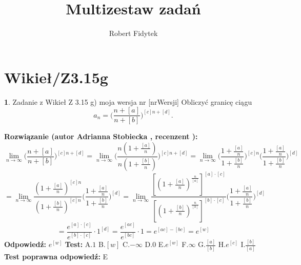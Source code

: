 \documentclass[12pt, a4paper]{article}
\title{Multizestaw zadań}
\author{Robert Fidytek}
\date{}
\theoremstyle{definition} %
\newtheorem{zad}{}
\newcommand{\kategoria}[1]{\section{#1}} %
\newcommand{\zadStart}[1]{\begin{zad}#1\newline} %
\newcommand{\zadStop}{\end{zad}}   %
\newcommand{\rozwStart}[2]{\noindent \textbf{Rozwiązanie (autor #1 , recenzent #2): }\newline} %
\newcommand{\rozwStop}{\newline}                                            %
\newcommand{\odpStart}{\noindent \textbf{Odpowiedź:}\newline}    %
\newcommand{\odpStop}{\newline}                                             %
\newcommand{\testStart}{\noindent \textbf{Test:}\newline} %
\newcommand{\testStop}{\newline} %
\newcommand{\kluczStart}{\noindent \textbf{Test poprawna odpowiedź:}\newline} %
\newcommand{\kluczStop}{\newline} %
\begin{document}
\maketitle


\kategoria{Wikieł/Z3.15g}
\zadStart{Zadanie z Wikieł Z 3.15 g) moja wersja nr [nrWersji]}
Obliczyć granicę ciągu 
$$a_n=\bigg(\frac{n+[a]}{n+[b]}\bigg)^{[c]n+[d]}.$$
\zadStop
\rozwStart{Adrianna Stobiecka}{}
$$\lim_{n\to\infty}\bigg(\frac{n+[a]}{n+[b]}\bigg)^{[c]n+[d]}=\lim_{n\to\infty}\bigg(\frac{n(1+\frac{[a]}{n})}{n(1+\frac{[b]}{n})}\bigg)^{[c]n+[d]}=\lim_{n\to\infty}\bigg(\frac{1+\frac{[a]}{n}}{1+\frac{[b]}{n}}\bigg)^{[c]n}\bigg(\frac{1+\frac{[a]}{n}}{1+\frac{[b]}{n}}\bigg)^{[d]}$$
$$=\lim_{n\to\infty}\frac{(1+\frac{[a]}{n})^{[c]n}}{(1+\frac{[b]}{n})^{[c]n}}\bigg(\frac{1+\frac{[a]}{n}}{1+\frac{[b]}{n}}\bigg)^{[d]}=\lim_{n\to\infty}\frac{[(1+\frac{[a]}{n})^{\frac{n}{[a]}}]^{[a]\cdot[c]}}{[(1+\frac{[b]}{n})^{\frac{n}{[b]}}]^{[b]\cdot[c]}}\bigg(\frac{1+\frac{[a]}{n}}{1+\frac{[b]}{n}}\bigg)^{[d]}$$
$$=\frac{e^{[a]\cdot[c]}}{e^{[b]\cdot[c]}}\cdot1^{[d]}=\frac{e^{[ac]}}{e^{[bc]}}\cdot1=e^{[ac]-[bc]}=e^{[w]}$$
\rozwStop
\odpStart
 $e^{[w]}$
\odpStop
\testStart
A.$1$
B.$[w]$
C.$-\infty$
D.$0$
E.$e^{[w]}$
F.$\infty$
G.$\frac{[a]}{[b]}$
H.$e^{[c]}$
I.$\frac{[b]}{[a]}$
\testStop
\kluczStart
E
\kluczStop
\end{document}
